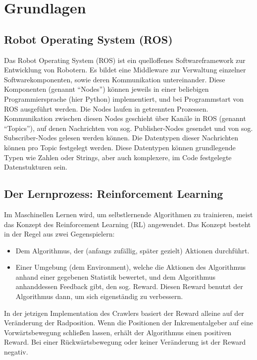 \section{Grundlagen}


\subsection{Robot Operating System (ROS)}

Das Robot Operating System (ROS)\cite{ros} ist ein quelloffenes Softwareframework zur Entwicklung von Robotern. Es bildet eine Middleware zur Verwaltung einzelner Softwarekomponenten, sowie deren Kommunikation untereinander. Diese Komponenten (genannt ``Nodes'') können jeweils in einer beliebigen Programmiersprache (hier Python) implementiert, und bei Programmstart von ROS ausgeführt werden. Die Nodes laufen in getrennten Prozessen. Kommunikation zwischen diesen Nodes geschieht über Kanäle in ROS (genannt ``Topics''), auf denen Nachrichten von sog. Publisher-Nodes gesendet und von sog. Subscriber-Nodes gelesen werden können. Die Datentypen dieser Nachrichten können pro Topic festgelegt werden. Diese Datentypen können grundlegende Typen wie Zahlen oder Strings, aber auch komplexere, im Code festgelegte Datenstukturen sein.

\subsection{Der Lernprozess: Reinforcement Learning}
\label{sec:reinforcement_learning}

Im Maschinellen Lernen wird, um selbstlernende Algorithmen zu trainieren, meist das Konzept des Reinforcement Learning (RL) angewendet. Das Konzept besteht in der Regel aus zwei Gegenspielern:
\begin{itemize}
    \item Dem Algorithmus, der (anfangs zufällig, später gezielt) Aktionen durchführt.
    \item Einer Umgebung (dem Environment), welche die Aktionen des Algorithmus anhand einer gegebenen Statistik bewertet, und dem Algorithmus anhanddessen Feedback gibt, den sog. Reward. Diesen Reward benutzt der Algorithmus dann, um sich eigenständig zu verbessern.
\end{itemize}

In der jetzigen Implementation des Crawlers basiert der Reward alleine auf der Veränderung der Radposition. Wenn die Positionen der Inkrementalgeber auf eine Vorwärtsbewegung schließen lassen, erhält der Algorithmus einen positiven Reward. Bei einer Rückwärtsbewegung oder keiner Veränderung ist der Reward negativ.

